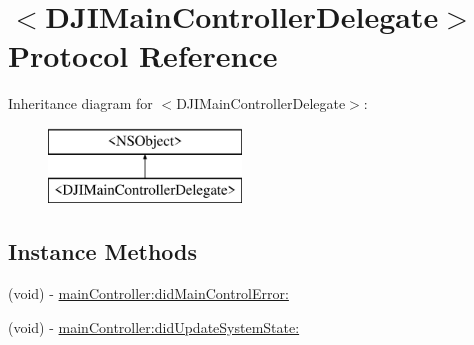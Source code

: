 \hypertarget{protocol_d_j_i_main_controller_delegate-p}{\section{$<$D\+J\+I\+Main\+Controller\+Delegate$>$ Protocol Reference}
\label{protocol_d_j_i_main_controller_delegate-p}
}
Inheritance diagram for $<$D\+J\+I\+Main\+Controller\+Delegate$>$\+:\begin{figure}[H]
\begin{center}
\leavevmode
\includegraphics[height=2.000000cm]{protocol_d_j_i_main_controller_delegate-p}
\end{center}
\end{figure}
\subsection*{Instance Methods}
\begin{DoxyCompactItemize}
\item 
(void) -\/ \hyperlink{protocol_d_j_i_main_controller_delegate-p_acbb11b8d37bbcf49fa6763921de3c77c}{main\+Controller\+:did\+Main\+Control\+Error\+:}
\item 
(void) -\/ \hyperlink{protocol_d_j_i_main_controller_delegate-p_ae9d64c21b32e83fa8e7b4e04f01f9d98}{main\+Controller\+:did\+Update\+System\+State\+:}
\end{DoxyCompactItemize}


